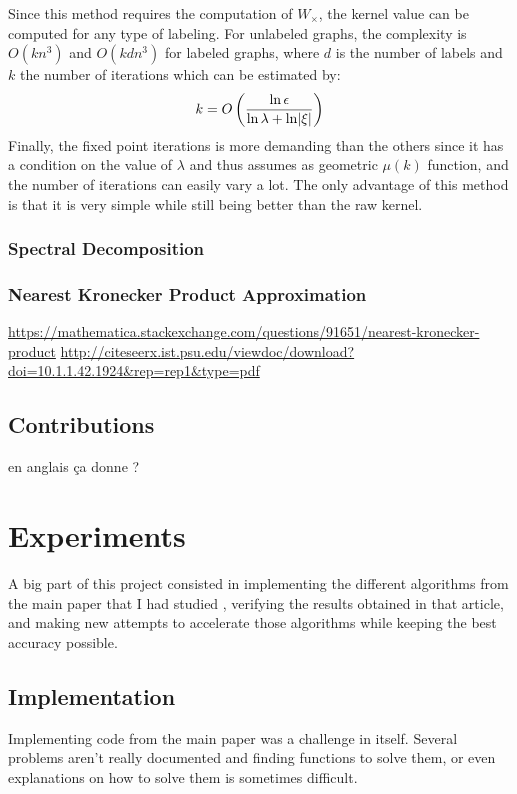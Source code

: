 \documentclass{article}
\DeclarePairedDelimiter{\abs}{\lvert}{\rvert}
\theoremstyle{definition}
\begin{document}
Since this method requires the computation of $W_\times$, the kernel value can be computed for any type of labeling. For unlabeled graphs, the complexity is $O(kn^3)$ and $O(kdn^3)$ for labeled graphs, where $d$ is the number of labels and $k$ the number of iterations which can be estimated by:
\begin{equation}
	k=O\left(\frac{\ln \epsilon}{\ln \lambda + \ln \abs{\xi}}\right)
\end{equation}
Finally, the fixed point iterations is more demanding than the others since it has a condition on the value of $\lambda$ and thus assumes as geometric $\mu(k)$ function, and the number of iterations can easily vary a lot. The only advantage of this method is that it is very simple while still being better than the raw kernel.
\subsubsection{Spectral Decomposition}

\subsubsection{Nearest Kronecker Product Approximation}
\url{https://mathematica.stackexchange.com/questions/91651/nearest-kronecker-product}
\url{http://citeseerx.ist.psu.edu/viewdoc/download?doi=10.1.1.42.1924&rep=rep1&type=pdf}\cite{VanLoan1993}
\subsection{Contributions}
en anglais ça donne ?



\section{Experiments}
A big part of this project consisted in implementing the different algorithms from the main paper that I had studied \cite{vishwanathan_graph_2010}, verifying the results obtained in that article, and making new attempts to accelerate those algorithms while keeping the best accuracy possible.
\subsection{Implementation}
Implementing code from the main paper was a challenge in itself. Several problems aren't really documented and finding functions to solve them, or even explanations on how to solve them is sometimes difficult.
\end{document}
